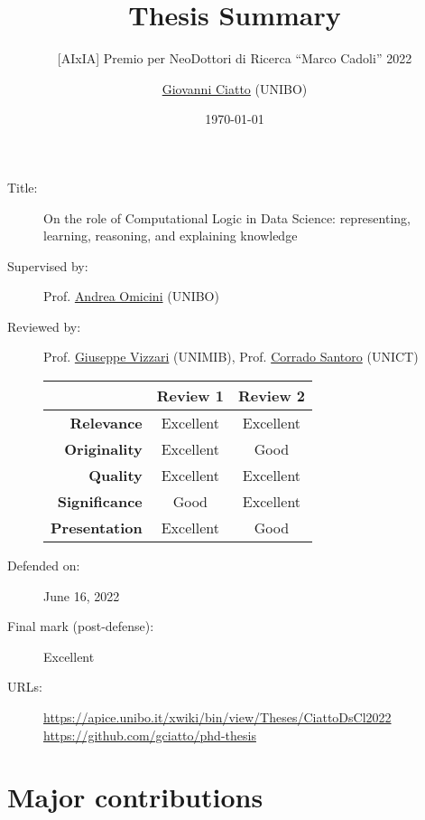 \documentclass[12pt]{scrartcl}
\title{Thesis Summary}
\subtitle{[AIxIA] Premio per NeoDottori di Ricerca ``Marco Cadoli'' 2022}
\author{\href{mailto:giovanni.ciatto@unibo.it}{Giovanni Ciatto} (UNIBO)}
\date{\today}
\begin{document}
\maketitle


\begin{description}
    \item[Title:] On the role of Computational Logic in Data Science: representing, learning, reasoning, and explaining knowledge
    \item[Supervised by:] Prof. \href{mailto:andrea.omicini@unibo.it}{Andrea Omicini} (UNIBO)
    \item[Reviewed by:] Prof. \href{mailto:giuseppe.vizzari@unimib.it}{Giuseppe Vizzari} (UNIMIB), Prof. \href{mailto:santoro@dmi.unict.it}{Corrado Santoro} (UNICT)
    \begin{center}
        \begin{tabular}{r||c|c}
            & \textbf{Review 1} & \textbf{Review 2}
            \\\hline\hline
            \textbf{Relevance}    & Excellent         & Excellent         \\
            \textbf{Originality}  & Excellent         & Good              \\
            \textbf{Quality}      & Excellent         & Excellent         \\
            \textbf{Significance} & Good              & Excellent         \\
            \textbf{Presentation} & Excellent         & Good
        \end{tabular}
    \end{center}
    \item[Defended on:] June 16, 2022
    \item[Final mark (post-defense):] Excellent
    \item[URLs:] \url{https://apice.unibo.it/xwiki/bin/view/Theses/CiattoDsCl2022}
    \\
    \url{https://github.com/gciatto/phd-thesis}
\end{description}

\pagebreak

\section*{Major contributions}
\end{document}
